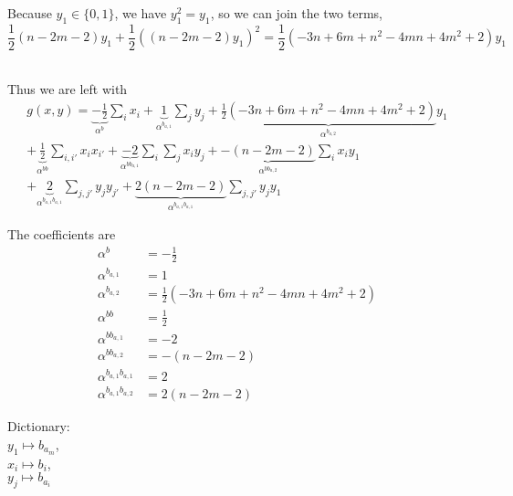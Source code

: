 \documentclass[english,notitlepage,longbibliography,showpacs,preprintnumbers,amsmath,amssymb,aps,prx,nofootinbib,12pt,superscriptaddress]{revtex4-1}
\begin{document}
\noindent Because $y_{1}\in\{0,1\}$, we have $y_{1}^2=y_{1}$, so we can join the two terms,
\begin{equation}
  \frac{1}{2}(n-2m-2)y_1 + \frac{1}{2}((n-2m-2)y_1)^2 = \frac{1}{2}(-3n + 6m + n^2 - 4mn + 4m^2 + 2)y_1
\end{equation}

\noindent \\Thus we are left with
\begin{equation}
\begin{split}
  \left.
  g(x,y)
  \right.
  = \underbrace{-\frac{1}{2}}_{\alpha^b}\sum_i x_i
  + \underbrace{1}_{\alpha^{b_{a,1}}}\sum_j y_j
  + \underbrace{\frac{1}{2}\left(-3n + 6m + n^2 - 4mn + 4m^2 + 2\right)}_{\alpha^{b_{a,2}}}y_1\\
  + \underbrace{\frac{1}{2}}_{\alpha^{bb}}\sum_{i,i'}x_i x_{i'}
  + \underbrace{-2}_{\alpha^{bb_{a,1}}}\sum_i \sum_j x_i y_j
  + \underbrace{-\left(n-2m-2\right)}_{\alpha^{bb_{a,2}}}\sum_i x_i y_{1}\\
  + \underbrace{2}_{\alpha^{b_{a,1}b_{a,1}}}\sum_{j,j'} y_j y_{j'}
  + \underbrace{2\left(n-2m-2\right)}_{\alpha^{b_{a,1}b_{a,1}}}\sum_{j,j'} y_j y_{1}
\end{split}
\end{equation}

\noindent The coefficients are
\begin{subequations}
\begin{align}
\alpha^b &= -\frac{1}{2}\\
\alpha^{b_{a,1}} &= 1\\
\alpha^{b_{a,2}} &= \frac{1}{2}\left(-3n + 6m + n^2 - 4mn + 4m^2 + 2\right)\\
\alpha^{bb} &= \frac{1}{2}\\
\alpha^{bb_{a,1}} &= -2\\
\alpha^{bb_{a,2}} &= -(n-2m-2)\\
\alpha^{b_{a,1}b_{a,1}} &= 2\\
\alpha^{b_{a,1}b_{a,2}} &= 2(n-2m-2)
\end{align}
\end{subequations}

\noindent Dictionary:\\
$y_{1}\mapsto b_{a_m}$,\\
$x_i\mapsto b_i$,\\
$y_j\mapsto b_{a_i}$\\



\end{document}
